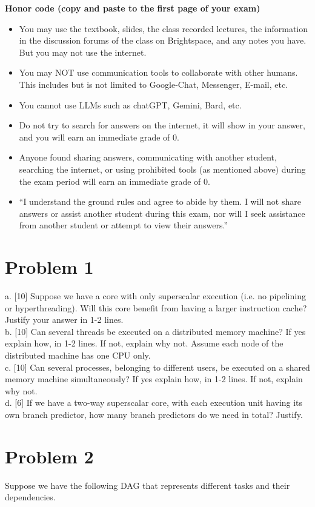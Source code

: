 \documentclass{article}
\begin{document}
\textbf{Honor code (copy and paste to the first page of your exam)}
\begin{itemize}
    \item You may use the textbook, slides, the class recorded lectures, the information in the discussion forums of the class on Brightspace, and any notes you have. But you may not use the internet.
    \item You may NOT use communication tools to collaborate with other humans. This includes but is not limited to Google-Chat, Messenger, E-mail, etc.
    \item You cannot use LLMs such as chatGPT, Gemini, Bard, etc.
    \item Do not try to search for answers on the internet, it will show in your answer, and you will earn an immediate grade of 0.
    \item Anyone found sharing answers, communicating with another student, searching the internet, or using prohibited tools (as mentioned above) during the exam period will earn an immediate grade of 0.
    \item “I understand the ground rules and agree to abide by them. I will not share answers or assist another student during this exam, nor will I seek assistance from another student or attempt to view their answers.”
\end{itemize}

\section*{Problem 1}
a. [10] Suppose we have a core with only superscalar execution (i.e. no pipelining or hyperthreading). Will this core benefit from having a larger instruction cache? Justify your answer in 1-2 lines. \\
b. [10] Can several threads be executed on a distributed memory machine? If yes explain how, in 1-2 lines. If not, explain why not. Assume each node of the distributed machine has one CPU only. \\
c. [10] Can several processes, belonging to different users, be executed on a shared memory machine simultaneously? If yes explain how, in 1-2 lines. If not, explain why not. \\
d. [6] If we have a two-way superscalar core, with each execution unit having its own branch predictor, how many branch predictors do we need in total? Justify.

\section*{Problem 2}
Suppose we have the following DAG that represents different tasks and their dependencies.
\end{document}
